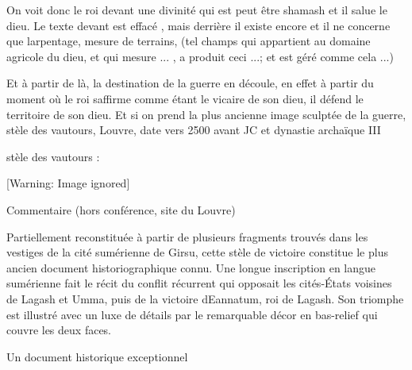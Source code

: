 \documentclass{article}
\begin{document}
On voit donc le roi devant une divinité qui est peut être shamash et il
salue le dieu. Le texte devant est effacé , mais derrière il existe
encore et il ne concerne que l{\textquotesingle}arpentage, mesure de
terrains, (tel champs qui appartient au domaine agricole du dieu, et
qui mesure ... , a produit ceci ...; et est géré comme cela ...)

Et à partir de là, la destination de la guerre en découle,  en effet à
partir du moment où le roi s{\textquotesingle}affirme comme étant le
vicaire de son dieu, il défend le territoire de son dieu. Et si on
prend la plus ancienne image sculptée de la guerre, stèle des vautours,
Louvre, date vers 2500 avant JC et dynastie archaïque III

stèle des vautours : 

  [Warning: Image ignored] %
 

Commentaire  (hors conférence, site du Louvre)

Partiellement reconstituée à partir de plusieurs fragments trouvés dans
les vestiges de la cité sumérienne de Girsu, cette stèle de victoire
constitue le plus ancien document historiographique connu. Une longue
inscription en langue sumérienne fait le récit du conflit récurrent qui
opposait les cités-États voisines de Lagash et Umma, puis de la
victoire d{\textquotesingle}Eannatum, roi de Lagash. Son triomphe est
illustré avec un luxe de détails par le remarquable décor en bas-relief
qui couvre les deux faces.

Un document historique exceptionnel
\end{document}
